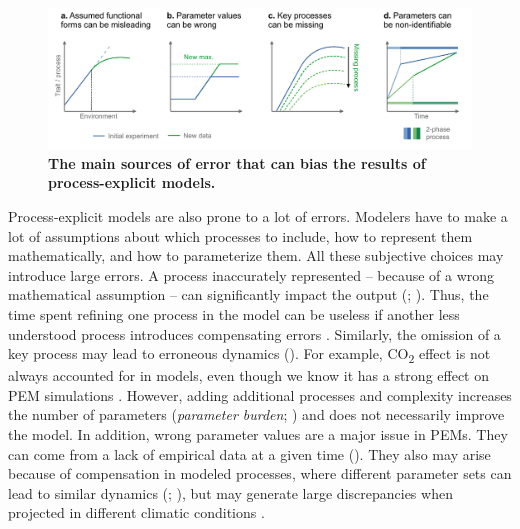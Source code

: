 \begin{figure}[hp]
\hspace{-1.4cm}
\centering
\begin{subcaptiongroup}
\label{fig:pbmissuesA} 
\label{fig:pbmissuesB}
\label{fig:pbmissuesC}
\label{fig:pbmissuesD}
\end{subcaptiongroup}
\includegraphics{0introduction/figs/pbm_issue.pdf}
\caption{\textbf{The main sources of error that can bias the results of process-explicit models.}}
\label{fig:pbmissues}
\end{figure}

Process-explicit models are also prone to a lot of errors. Modelers have to make a lot of assumptions about which processes to include, how to represent them mathematically, and how to parameterize them. All these subjective choices may introduce large errors. A process inaccurately represented -- because of a wrong mathematical assumption -- can significantly impact the output (; \citealp{Dietze2017, Wolkovich2021}). Thus, the time spent refining one process in the model can be useless if another less understood process introduces compensating errors \citep{Korzukhin1996}. Similarly, the omission of a key process may lead to erroneous dynamics (). For example, CO\textsubscript{2} effect is not always accounted for in models, even though we know it has a strong effect on PEM simulations \citep{Keenan2011a}. However, adding additional processes and complexity increases the number of parameters (\emph{parameter burden}; \citealp{Franklin2020}) and does not necessarily improve the model.
In addition, wrong parameter values are a major issue in PEMs. They can come from a lack of empirical data at a given time (). They also may arise because of compensation in modeled processes, where different parameter sets can lead to similar dynamics (; \citealp{Luo2009}), but  may generate large discrepancies when projected in different climatic conditions \citep{Chuine2016}. 

